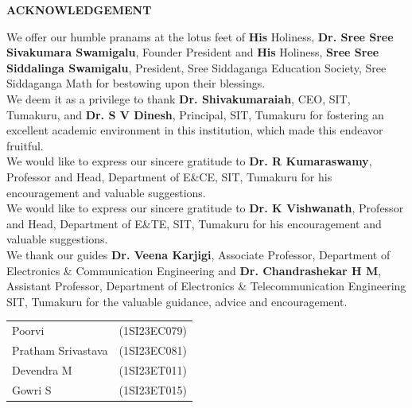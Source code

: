 \begin{titlepage}
\begin{center}
{\Large \textbf{ACKNOWLEDGEMENT}}
\end{center}

We offer our humble pranams at the lotus feet of \textbf{His} Holiness, \textbf{Dr. Sree Sree Sivakumara Swamigalu}, Founder President and \textbf{His} Holiness, \textbf{Sree Sree Siddalinga Swamigalu}, President, Sree Siddaganga Education Society, Sree Siddaganga Math for bestowing upon their blessings.\\

We deem it as a privilege to thank \textbf{Dr. Shivakumaraiah}, CEO, SIT, Tumakuru,  and \textbf{Dr. S V Dinesh}, Principal, SIT, Tumakuru for fostering an excellent academic environment in this institution, which made this endeavor fruitful.\\

We would like to express our sincere gratitude to \textbf{Dr. R Kumaraswamy}, Professor and Head, Department of E\&CE, SIT, Tumakuru for his encouragement and valuable suggestions.\\


We would like to express our sincere gratitude to \textbf{Dr. K Vishwanath}, Professor and Head, Department of E\&TE, SIT, Tumakuru for his encouragement and valuable suggestions.\\

We thank our guides \textbf{Dr. Veena Karjigi}, Associate Professor, Department of Electronics \& Communication Engineering and \textbf{Dr. Chandrashekar H M}, Assistant  Professor, Department of Electronics \& Telecommunication Engineering SIT, Tumakuru for the valuable guidance, advice and encouragement.\\





\begin{flushright}
\begin{tabular}{ll}
Poorvi & (1SI23EC079)  \\
Pratham Srivastava & (1SI23EC081)  \\
Devendra M & (1SI23ET011)  \\
Gowri S & (1SI23ET015)  \\
\end{tabular}\\[1.5cm]
\end{flushright}
\end{titlepage}